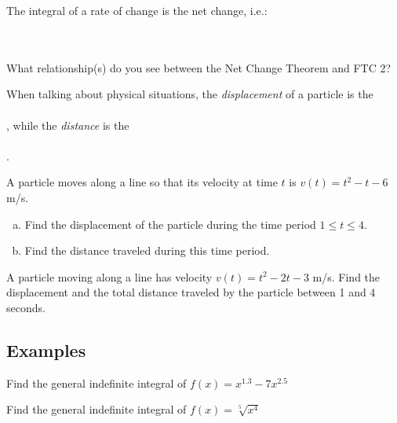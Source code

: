 \documentclass[notes]{subfiles}
\begin{document}
		\begin{thm}
			The integral of a rate of change is the net change, i.e.:
				\\ \\ \\ 
		\end{thm}
		\begin{question}
			What relationship(s) do you see between the Net Change Theorem and FTC 2?
		\end{question}
			
		\begin{rmk}
			When talking about physical situations, the \emph{displacement} of a particle is the
				 \\ \\ , while the \emph{distance} is the 
				 \\ \\ .
		\end{rmk}
			\newpage
			
		\begin{ex}
			A particle moves along a line so that its velocity at time \(t\) is \(v(t) = t^2-t-6\) m/s. 
			\begin{enumerate}[(a)]
				\item Find the displacement of the particle during the time period \(1\leq t\leq 4\).
					
				\item Find the distance traveled during this time period.
					
			\end{enumerate}
		\end{ex}
		
		\begin{ex}
			A particle moving along a line has velocity \(v(t) = t^2 -2t-3\) m/s.  Find the displacement and the total distance traveled by the particle between 1 and 4 seconds.
		\end{ex}
			\vs{1.5}
			\newpage
			
	\subsection*{Examples}
		\begin{ex}
			Find the general indefinite integral of \(f(x) = x^{1.3}-7x^{2.5}\)
		\end{ex}
			\vs{1}
			
		\begin{ex}
			Find the general indefinite integral of \(f(x) = \sqrt[5]{x^4}\)
		\end{ex}
			
\end{document}
